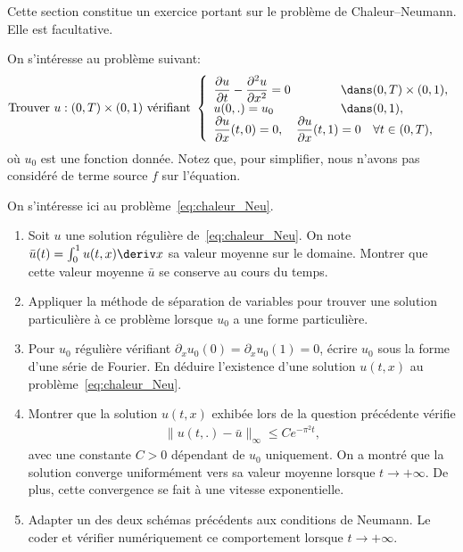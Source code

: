 \documentclass[12pt,a4paper,twoside]{article}
\begin{document}
Cette section constitue un exercice portant sur le probl\`eme de Chaleur--Neumann.
Elle est facultative.


On s'int\'eresse au probl\`eme suivant:
\begin{equation}
  \label{eq:chaleur_Neu}
  \text{Trouver $u : (0,T) \times (0,1)$ v\'erifiant }
  \left\{
    \begin{array}{l l}
      \dfrac{\partial u}{\partial t} - \dfrac{\partial^2 u}{\partial x^2} = 0
      & \!\!\!\! \!\!\!\! \!\!\!\! \!\!\!\! \dans (0,T) \times (0,1) ,
      \\
      u(0,.) = u_0 
      & \!\!\!\! \!\!\!\! \!\!\!\! \!\!\!\! \dans (0,1) ,
      \\
      \dfrac{\partial u}{\partial x}(t,0) = 0 ,
      \quad \dfrac{\partial u}{\partial x}(t,1) = 0 & \forall t \in (0,T) ,
    \end{array}
  \right.
\end{equation}
o\`u $u_0$ est une fonction donn\'ee.
Notez que, pour simplifier, nous n'avons pas consid\'er\'e de terme source $f$ sur l'\'equation.

\begin{exercise}
  On s'int\'eresse ici au probl\`eme~\eqref{eq:chaleur_Neu}.
  \begin{enumerate}
  \item Soit $u$ une solution r\'eguli\`ere de~\eqref{eq:chaleur_Neu}.
    On note $\bar{u}(t) = \int_0^1 u(t,x) \deriv x$ sa valeur moyenne sur le domaine.
    Montrer que cette valeur moyenne $\bar{u}$ se conserve au cours du temps.
  \item Appliquer la m\'ethode de s\'eparation de variables pour trouver une solution
    particuli\`ere \`a ce probl\`eme lorsque $u_0$ a une forme particuli\`ere.
  \item Pour $u_0$ r\'eguli\`ere v\'erifiant $\partial_x u_0(0) = \partial_x u_0(1) = 0$,
    \'ecrire $u_0$ sous la forme d'une s\'erie de Fourier.
    En d\'eduire l'existence d'une solution $u(t,x)$ au probl\`eme~\eqref{eq:chaleur_Neu}.
  \item Montrer que la solution $u(t,x)$ exhib\'ee lors de la question pr\'ec\'edente v\'erifie
    \begin{align*}
      \| u(t,.) - \bar{u} \|_{\infty} \leq C e^{- \pi^2 t} ,
    \end{align*}
    avec une constante $C > 0$ d\'ependant de $u_0$ uniquement.
    On a montr\'e que la solution converge uniform\'ement vers sa valeur moyenne
    lorsque $t \to + \infty$.
    De plus, cette convergence se fait \`a une vitesse exponentielle.
  \item Adapter un des deux sch\'emas pr\'ec\'edents aux conditions de Neumann.
    Le coder et v\'erifier num\'eriquement ce comportement lorsque $t \to + \infty$.
  \end{enumerate}
\end{exercise}
\end{document}
